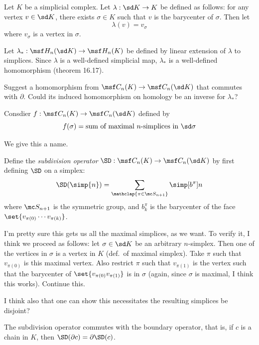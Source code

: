 \begin{definition}
  Let $K$ be a simplicial complex. Let $\lambda : \sd K \to K$ be defined as
  follows: for any vertex $v \in \sd K$, there exists $\sigma \in K$ such that
  $v$ is the barycenter of $\sigma$. Then let
  \[
    \lambda(v) = v_\sigma
  \]
  where $v_\sigma$ is a vertex in $\sigma$.
\end{definition}
\begin{definition}[$\lambda_*$]
  Let $\lambda_* : \msf H_n(\sd K) \to \msf H_n(K)$ be defined by linear
  extension of $\lambda$ to simplices. Since $\lambda$ is a well-defined
  simplicial map, $\lambda_*$ is a well-defined homomorphism (theorem 16.17).
\end{definition}
\begin{problem}[16.19]
  Suggest a homomorphism from $\msf C_n(K) \to \msf C_n(\sd K)$ that commutes
  with $\partial$. Could its induced homomorphism on homology be an inverse for
  $\lambda_*$?
\end{problem}
\begin{solution}
  Consdier $f : \msf C_n(K) \to \msf C_n(\sd K)$ defined by
  \[
    f(\sigma) = \text{sum of maximal $n$-simplices in $\sd \sigma$}
  \]
\end{solution}
We give this a name.
\begin{definition}
  Define the \emph{subdivision operator} $\SD : \msf C_n(K) \to \msf C_n(\sd K)$
  by first defining $\SD$ on a simplex:
  \[
    \SD(\simp{n}) = \sum_{\mathclap{\pi \in \mc S_{n+1}}} \simp[b^{\pi}]{n}
  \]
  where $\mc S_{n+1}$ is the symmetric group, and $b_k^\pi$ is the barycenter of
  the face $\set{v_{\pi(0)}\cdots v_{\pi(k)}}$.
\end{definition}
\begin{note}
  I'm pretty sure this gets us all the maximal simplices, as we want. To verify
  it, I think we proceed as follows: let $\sigma \in \sd K$ be an arbitrary
  $n$-simplex. Then one of the vertices in $\sigma$ is a vertex in $K$ (def.\ of
  maximal simplex). Take $\pi$ such that $v_{\pi(0)}$ is this maximal vertex.
  Also restrict $\pi$ such that $v_{\pi(1)}$ is the vertex such that the
  barycenter of $\set{v_{\pi(0)}v_{\pi(1)}}$ is in $\sigma$ (again, since
  $\sigma$ is maximal, I think this works). Continue this.

  I think also that one can show this necessitates the resulting simplices be
  disjoint?
\end{note}
\begin{problem}[16.20]
  The subdivision operator commutes with the boundary operator, that is, if $c $
  is a chain in $K$, then $\SD(\partial c) = \partial \SD(c)$.
\end{problem}
